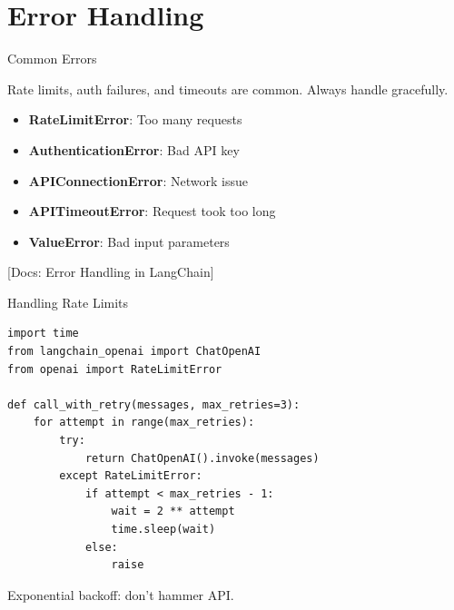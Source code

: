 \documentclass[aspectratio=169,11pt]{beamer}
\newcommand{\docref}[1]{{\scriptsize\color{docgray}[Docs: #1]}}
\begin{document}
\section{Error Handling}

\begin{frame}[fragile]{Common Errors}
  \begin{conceptbox}
    Rate limits, auth failures, and timeouts are common. Always handle gracefully.
  \end{conceptbox}

  \begin{itemize}
    \setlength{\itemsep}{1pt}
    \item \textbf{RateLimitError}: Too many requests
    \item \textbf{AuthenticationError}: Bad API key
    \item \textbf{APIConnectionError}: Network issue
    \item \textbf{APITimeoutError}: Request took too long
    \item \textbf{ValueError}: Bad input parameters
  \end{itemize}

  \docref{Error Handling in LangChain}
\end{frame}

\begin{frame}[fragile]{Handling Rate Limits}
  \begin{codebox}
    \begin{lstlisting}[basicstyle=\ttfamily\tiny]
import time
from langchain_openai import ChatOpenAI
from openai import RateLimitError

def call_with_retry(messages, max_retries=3):
    for attempt in range(max_retries):
        try:
            return ChatOpenAI().invoke(messages)
        except RateLimitError:
            if attempt < max_retries - 1:
                wait = 2 ** attempt
                time.sleep(wait)
            else:
                raise
    \end{lstlisting}
  \end{codebox}
  \vspace{-0.2cm}
  \begin{tipbox}
    Exponential backoff: don't hammer API.
  \end{tipbox}
\end{frame}
\end{document}
